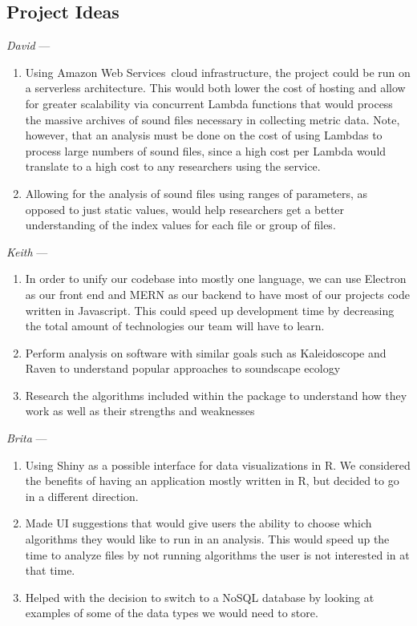 \subsection{Project Ideas}
\textit{David} ---
\begin{enumerate}
    \item Using Amazon Web Services\textquotesingle\ cloud infrastructure, the project could be run on a serverless architecture. This would both lower the cost of hosting and allow for greater scalability via concurrent Lambda functions that would process the massive archives of sound files necessary in collecting metric data. Note, however, that an analysis must be done on the cost of using Lambdas to process large numbers of sound files, since a high cost per Lambda would translate to a high cost to any researchers using the service.
    \item Allowing for the analysis of sound files using ranges of parameters, as opposed to just static values, would help researchers get a better understanding of the index values for each file or group of files.
\end{enumerate}

\textit{Keith} ---
\begin{enumerate}
    \item In order to unify our codebase into mostly one language, we can use Electron as our front end and MERN as our backend to have most of our project\textquotesingle s code written in Javascript. This could speed up development time by decreasing the total amount of technologies our team will have to learn.
    \item Perform analysis on software with similar goals such as Kaleidoscope and Raven to understand popular approaches to soundscape ecology
    \item Research the algorithms included within the  package to understand how they work as well as their strengths and weaknesses
\end{enumerate}

\textit{Brita} ---
\begin{enumerate}
    \item Using Shiny as a possible interface for data visualizations in R. We considered the benefits of having an application mostly written in R, but decided to go in a different direction.
    \item Made UI suggestions that would give users the ability to choose which algorithms they would like to run in an analysis. This would speed up the time to analyze files by not running algorithms the user is not interested in at that time.
    \item Helped with the decision to switch to a NoSQL database by looking at examples of some of the data types we would need to store.
\end{enumerate}

